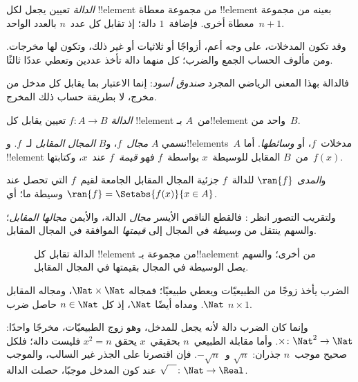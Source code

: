 \documentclass[../../../include/open-logic-section]{subfiles}
\begin{document}

\begin{explain}
\emph{الدالة} تعيين يجعل لكل !!{element} من مجموعة معطاة
!!{element} بعينه من مجموعة معطاة أخرى. فإضافة~$1$ دالة؛ إذ
تقابل كل عدد~$n$ بالعدد الواحد~$n+1$.

وقد تكون المدخلات، على وجه أعم، أزواجًا أو ثلاثيات أو غير ذلك،
وتكون لها مخرجات. ومن مألوف الحساب الجمع والضرب؛ كل منهما دالة
تأخذ عددين وتعطي عددًا ثالثًا.

فالدالة بهذا المعنى الرياضي المجرد \emph{صندوق أسود}:
إنما الاعتبار بما يقابل كل مدخل من مخرج، لا بطريقة حساب ذلك المخرج.
\end{explain}

\begin{defn}[الدالة]
\emph{الدالة} $f \colon A \to B$ تعيين يقابل كل !!{element}
من~$A$ بـ!!{element} واحد من~$B$.

نسمي $A$ \emph{مجال}~$f$، و$B$ \emph{المجال المقابل} لـ~$f$.
و!!{element}s~$A$ مدخلات~$f$، أو \emph{وسائطها}. أما !!{element}
من~$B$ المقابل للوسيطة~$x$ بواسطة~$f$ فهو \emph{قيمة~$f$} عند~$x$،
وكتابتها~$f(x)$.

و\emph{المدى} $\ran{f}$ للدالة~$f$ جزئية المجال المقابل
الجامعة لقيم~$f$ التي تحصل عند وسيطة ما؛ أي $\ran{f} =
\Setabs{f(x)}{x \in A}$.
\end{defn}

ولتقريب التصور انظر : فالقطع الناقص الأيسر
\emph{مجال} الدالة، والأيمن \emph{مجالها المقابل}؛ والسهم ينتقل من
\emph{وسيطة} في المجال إلى \emph{قيمتها} الموافقة في المجال المقابل.

\begin{figure}
  \caption{الدالة تقابل كل !!{element} من مجموعة بـ!!a{element} من أخرى؛
    والسهم يصل الوسيطة في المجال بقيمتها في المجال المقابل.}
\end{figure}

\begin{ex}
الضرب يأخذ زوجًا من الطبيعيّات ويعطي طبيعيًا؛ فمجاله
$\Nat \times \Nat$، ومجاله المقابل $\Nat$. ومداه أيضًا $\Nat$،
إذ كل $n \in \Nat$ حاصل ضرب $n \times 1$.
\end{ex}

\begin{ex}
وإنما كان الضرب دالة لأنه يجعل للمدخل، وهو زوج الطبيعيّات،
مخرجًا واحدًا: $\times \colon \Nat^2 \to \Nat$.
وأما مقابلة الطبيعي~$n$ بحقيقي~$x$ يحقق $x^2 = n$ فليست دالة؛
فلكل صحيح موجب~$n$ جذران: $\sqrt{n}$ و~$-\sqrt{n}$.
فإن اقتصرنا على الجذر غير السالب، والموجب عند كون المدخل موجبًا،
حصلت الدالة $\sqrt{\phantom{X}} \colon \Nat \to \Real$.
\end{ex}
\end{document}
